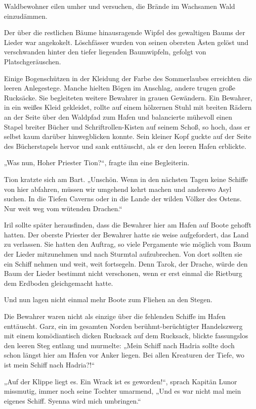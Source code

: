 Waldbewohner eilen umher und versuchen, die Brände im Wachsamen Wald einzudämmen.

Der über die restlichen Bäume hinausragende Wipfel des gewaltigen Baums der Lieder war angekokelt. Löschfässer wurden von seinen obersten Ästen gelöst und verschwanden hinter den tiefer liegenden Baumwipfeln, gefolgt von Platschgeräuschen.

Einige Bogenschützen in der Kleidung der Farbe des Sommerlaubes erreichten die leeren Anlegestege. Manche hielten Bögen im Anschlag, andere trugen große Rucksäcke. Sie begleiteten weitere Bewahrer in grauen Gewändern. Ein Bewahrer, in ein weißes Kleid gekleidet, rollte auf einem hölzernen Stuhl mit breiten Rädern an der Seite über den Waldpfad zum Hafen und balancierte mühevoll einen Stapel breiter Bücher und Schriftrollen-Kisten auf seinem Schoß, so hoch, dass er selbst kaum darüber hinwegblicken konnte. Sein kleiner Kopf guckte auf der Seite des Bücherstapels hervor und sank enttäuscht, als er den leeren Hafen erblickte.

„Was nun, Hoher Priester Tion?“, fragte ihn eine Begleiterin.

Tion kratzte sich am Bart. „Unschön. Wenn in den nächsten Tagen keine Schiffe von hier abfahren, müssen wir umgehend kehrt machen und anderswo Asyl suchen. In die Tiefen Caverns oder in die Lande der wilden Völker des Ostens. Nur weit weg vom wütenden Drachen.“

Iril sollte später herausfinden, dass die Bewahrer hier am Hafen auf Boote gehofft hatten. Der oberste Priester der Bewahrer hatte sie weise aufgefordert, das Land zu verlassen. Sie hatten den Auftrag, so viele Pergamente wie möglich vom Baum der Lieder mitzunehmen und nach Sturmtal aufzubrechen. Von dort sollten sie ein Schiff nehmen und weit, weit fortsegeln. Denn Tarok, der Drache, würde den Baum der Lieder bestimmt nicht verschonen, wenn er erst einmal die Rietburg dem Erdboden gleichgemacht hatte.

Und nun lagen nicht einmal mehr Boote zum Fliehen an den Stegen.

Die Bewahrer waren nicht als einzige über die fehlenden Schiffe im Hafen enttäuscht. Garz, ein im gesamten Norden berühmt-berüchtigter Handelszwerg mit einem komödiantisch dicken Rucksack auf dem Rucksack, blickte fassungslos den leeren Steg entlang und murmelte: „Mein Schiff nach Hadria sollte doch schon längst hier am Hafen vor Anker liegen. Bei allen Kreaturen der Tiefe, wo ist mein Schiff nach Hadria?!“

„Auf der Klippe liegt es. Ein Wrack ist es geworden!“, sprach Kapitän Lunor missmutig, immer noch seine Tochter umarmend, „Und es war nicht mal mein eigenes Schiff. Syenna wird mich umbringen.“

